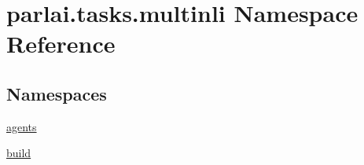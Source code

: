 \hypertarget{namespaceparlai_1_1tasks_1_1multinli}{}\section{parlai.\+tasks.\+multinli Namespace Reference}
\label{namespaceparlai_1_1tasks_1_1multinli}
\subsection*{Namespaces}
\begin{DoxyCompactItemize}
\item 
 \hyperlink{namespaceparlai_1_1tasks_1_1multinli_1_1agents}{agents}
\item 
 \hyperlink{namespaceparlai_1_1tasks_1_1multinli_1_1build}{build}
\end{DoxyCompactItemize}
